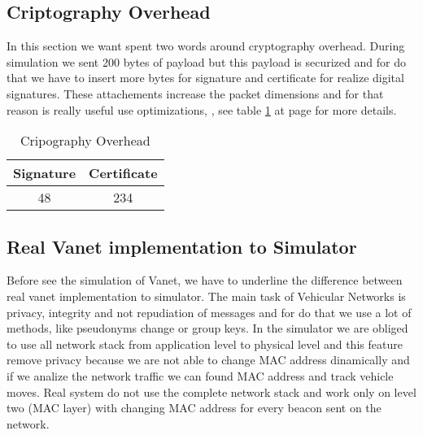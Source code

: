 \subsection{Criptography Overhead}\label{sec:CryptographyOverhead}
In this section we want spent two words around cryptography overhead. During simulation we sent 200 bytes of payload but this payload is securized and for do that we have to insert more bytes for signature and certificate for realize digital signatures. These attachements increase the packet dimensions and for that reason is really useful use optimizations, \cite{calandriello}, see table \ref{tab:CryptographyOverhead} at page \pageref{tab:CryptographyOverhead} for more details.
\begin{table}[!ht]
	\centering
	\caption{Cripography Overhead}
	\begin{tabular}{|c|c|}
	\hline\hline 
	\textbf{Signature} & \textbf{Certificate}\\
	\hline
		48 & 234\\
	\hline
	\hline     %
 	\end{tabular} 
	\label{tab:CryptographyOverhead}
\end{table}
\subsection{Real Vanet implementation to Simulator}
Before see the simulation of Vanet, we have to underline the difference between real vanet implementation to simulator. The main task of Vehicular Networks is privacy, integrity and not repudiation of messages and for do that we use a lot of methods, like pseudonyms change or group keys. In the simulator we are obliged to use all network stack from application level to physical level and this feature remove privacy because we are not able to change MAC address dinamically and if we analize the network traffic we can found MAC address and track vehicle moves. Real system do not use the complete network stack and work only on level two (MAC layer) with changing MAC address for every beacon sent on the network.
